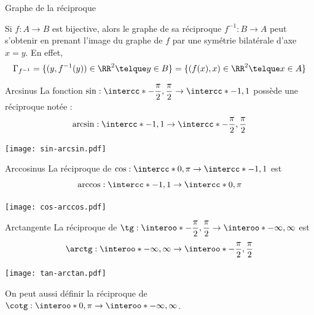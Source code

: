 \begin{frame}{Graphe de la réciproque}

Si $f : A \to B$ est bijective, alors le graphe de sa réciproque $f^{-1} : B \to A$ peut s'obtenir en prenant l'image du graphe de $f$ par une symétrie bilatérale d'axe $x = y$. En effet,
\begin{equation*}
\Gamma_{f^{-1}} = \{(y,f^{-1}(y)) \in \RR^2 \telque y \in B\}
= \{(f(x),x) \in \RR^2 \telque x \in A\}
\end{equation*} 
\end{frame}
\begin{frame}{Arcsinus}
La fonction $\sin : \intercc*{-\dfrac{\pi}{2}, \dfrac{\pi}{2}} \to \intercc*{-1,1}$
possède une réciproque notée :
\begin{equation*}
\arcsin : \intercc*{-1,1} \to \intercc*{-\dfrac{\pi}{2},\dfrac{\pi}{2}}
\end{equation*}

\begin{center}
\texttt{[image: sin-arcsin.pdf]}
\end{center}

\end{frame}
\begin{frame}{Arccosinus}
La réciproque de $\cos : \intercc*{0,\pi} \to \intercc*{-1,1}$ est
\begin{equation*}
\arccos : \intercc*{-1,1} \to \intercc*{0,\pi}
\end{equation*}

\begin{center}
\texttt{[image: cos-arccos.pdf]}
\end{center}

\end{frame}
\begin{frame}{Arctangente}
La réciproque de $\tg : \interoo*{-\dfrac{\pi}{2}, \dfrac{\pi}{2}} \to \interoo*{-\infty,
\infty}$ est 
\begin{equation*}
\arctg : \interoo*{-\infty, \infty} \to \interoo*{-\dfrac{\pi}{2},\dfrac{\pi}{2}}
\end{equation*}

\begin{center}
\texttt{[image: tan-arctan.pdf]}
\end{center}

On peut aussi définir la réciproque de $\cotg : \interoo*{0,\pi} \to \interoo*{-\infty,\infty}$.
\end{frame}


